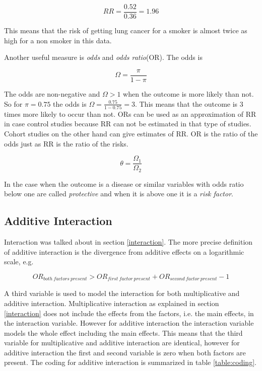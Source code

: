 \documentclass[10pt,a4paper]{report}
\begin{document}
\begin{equation}
RR=\frac{0.52}{0.36}=1.96
\end{equation}

This means that the risk of getting lung cancer for a smoker is almost twice as high for a non smoker in this data.

Another useful measure is \emph{odds} and \emph{odds ratio}(OR). The odds is\cite{agresti_categorical} 

\begin{equation}\label{eq:odds}
\Omega=\frac{\pi}{1-\pi}
\end{equation}

The odds are non-negative and $\Omega>1$ when the outcome is more likely than not\cite{agresti_categorical}. So for $\pi=0.75$ the odds is $\Omega=\frac{0.75}{1-0.75}=3$. This means that the outcome is 3 times more likely to occur than not. ORs can be used as an approximation of RR in case control studies because RR can not be estimated in that type of studies\cite{or_mislead}. Cohort studies on the other hand can give estimates of RR\cite{or_mislead}. OR is the ratio of the odds just as RR is the ratio of the risks\cite{agresti_categorical}.

\begin{equation}\label{eq:odds_ratio}
\theta=\frac{\Omega_1}{\Omega_2}
\end{equation}

In the case when the outcome is a disease or similar variables with odds ratio below one are called \emph{protective} and when it is above one it is a \emph{risk factor}\cite{recoding_2011}.

\subsection{Additive Interaction}
\label{additive}
Interaction was talked about in section \ref{interaction}. The more precise definition of additive interaction is the divergence from additive effects on a logarithmic scale, e.g\cite{rothman2008modern}.

\begin{equation}
OR_{both\:factors\:present}>OR_{first\:factor\:present}+OR_{second\:factor\:present}-1
\end{equation}

A third variable is used to model the interaction for both multiplicative and additive interaction. Multiplicative interaction as explained in section \ref{interaction} does not include the effects from the factors, i.e. the main effects, in the interaction variable. However for additive interaction the interaction variable models the whole effect including the main effects. This means that the third variable for multiplicative and additive interaction are identical, however for additive interaction the first and second variable is zero when both factors are present. The coding for additive interaction is summarized in table \ref{table:coding}\cite{uvehag_master_thesis}.
\end{document}
